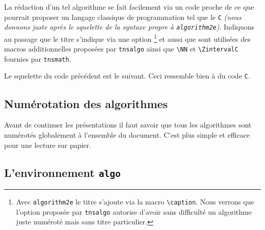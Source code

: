 \documentclass[12pt,a4paper]{article}
\theoremstyle{definition}
\newcommand\env[1]{\texttt{#1}}
\newcommand\macro[1]{\env{\textbackslash{}#1}}
\begin{document}
\bigskip

\bigskip


La rédaction d'un tel algorithme se fait facilement via un code proche de ce que pourrait proposer un langage classique de programmation tel que le \Verb#C# \emph{(nous donnons juste après le squelette de la syntaxe propre à \texttt{algorithm2e})}.
Indiquons au passage que le titre s'indique via une option
\footnote{
	Avec \texttt{algorithm2e} le titre s'ajoute via la macro \macro{caption}.
	Nous verrons que l'option proposée par \texttt{tnsalgo} autorise d'avoir sans difficulté un algorithme juste numéroté mais sans titre particulier.
}
et aussi que sont utilisées des macros additionnelles proposées par \verb#tnsalgo# ainsi que \macro{NN} et \macro{ZintervalC} fournies par \verb#tnsmath#.




Le squelette du code précédent est le suivant. Ceci ressemble bien à du code \verb#C#. 


\begin{latexex-alone}
\caption{...}


\end{latexex-alone}




\subsection{Numérotation des algorithmes}

Avant de continuer les présentations il faut savoir que tous les algorithmes sont numérotés globalement à l'ensemble du document. C'est plus simple et efficace pour une lecture sur papier.

\subsection{L'environnement \texttt{algo}}
\end{document}
